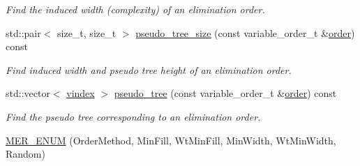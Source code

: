\begin{DoxyCompactItemize}
\begin{DoxyCompactList}\small\item\em Find the induced width (complexity) of an elimination order. \end{DoxyCompactList}\item 
std\+::pair$<$ size\+\_\+t, size\+\_\+t $>$ \hyperlink{classmerlin_1_1graphical__model_a60914b4dfd137288d059280a29db1d3f}{pseudo\+\_\+tree\+\_\+size} (const variable\+\_\+order\+\_\+t \&\hyperlink{classmerlin_1_1graphical__model_a90bcf3fb02f0f43bf57520e834875c78}{order}) const 
\begin{DoxyCompactList}\small\item\em Find induced width and pseudo tree height of an elimination order. \end{DoxyCompactList}\item 
std\+::vector$<$ \hyperlink{classmerlin_1_1graphical__model_a275006a490bc09239c12a4d93d53b135}{vindex} $>$ \hyperlink{classmerlin_1_1graphical__model_ab939be0ea59b1bb676e4b4ea5de0d625}{pseudo\+\_\+tree} (const variable\+\_\+order\+\_\+t \&\hyperlink{classmerlin_1_1graphical__model_a90bcf3fb02f0f43bf57520e834875c78}{order}) const 
\begin{DoxyCompactList}\small\item\em Find the pseudo tree corresponding to an elimination order. \end{DoxyCompactList}\item 
\hyperlink{classmerlin_1_1graphical__model_a912837b886d835280f269f1845dcb752}{M\+E\+R\+\_\+\+E\+N\+UM} (Order\+Method, Min\+Fill, Wt\+Min\+Fill, Min\+Width, Wt\+Min\+Width, Random)\hypertarget{classmerlin_1_1graphical__model_a912837b886d835280f269f1845dcb752}{}\label{classmerlin_1_1graphical__model_a912837b886d835280f269f1845dcb752}


\end{DoxyCompactItemize}
